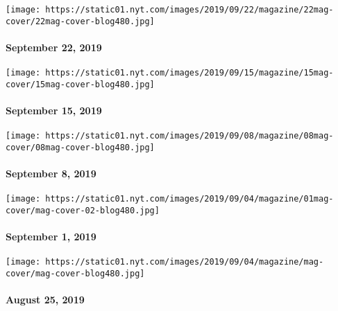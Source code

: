 \href{https://www.nytimes.com/issue/magazine/2019/09/20/the-92219-issue}{}

\texttt{[image: https://static01.nyt.com/images/2019/09/22/magazine/22mag-cover/22mag-cover-blog480.jpg]}

\hypertarget{september-22-2019}{%
\paragraph{September 22, 2019}\label{september-22-2019}}

\href{https://www.nytimes.com/issue/magazine/2019/09/13/the-91519-issue}{}

\texttt{[image: https://static01.nyt.com/images/2019/09/15/magazine/15mag-cover/15mag-cover-blog480.jpg]}

\hypertarget{september-15-2019}{%
\paragraph{September 15, 2019}\label{september-15-2019}}

\href{https://www.nytimes.com/issue/magazine/2019/09/05/the-9819-issue}{}

\texttt{[image: https://static01.nyt.com/images/2019/09/08/magazine/08mag-cover/08mag-cover-blog480.jpg]}

\hypertarget{september-8-2019}{%
\paragraph{September 8, 2019}\label{september-8-2019}}

\href{https://www.nytimes.com/issue/magazine/2019/09/04/the-90119-issue}{}

\texttt{[image: https://static01.nyt.com/images/2019/09/04/magazine/01mag-cover/mag-cover-02-blog480.jpg]}

\hypertarget{september-1-2019}{%
\paragraph{September 1, 2019}\label{september-1-2019}}

\href{https://www.nytimes.com/issue/magazine/2019/09/04/the-82519-issue}{}

\texttt{[image: https://static01.nyt.com/images/2019/09/04/magazine/mag-cover/mag-cover-blog480.jpg]}

\hypertarget{august-25-2019}{%
\paragraph{August 25, 2019}\label{august-25-2019}}

